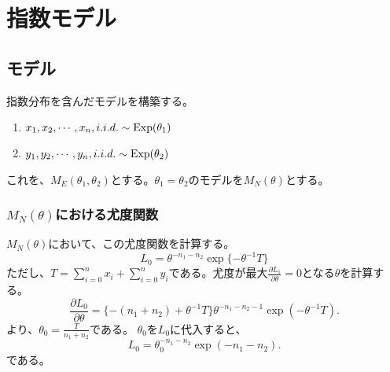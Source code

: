 \begin{comment}
 = (45-60*65/100)^2/(60*65/100)+(15-60*35/100)^2/(60*35/100)+(20-40*65/100)^2/(40*65/100) + (20-40*35/100)^2/(40*35/100)
 = 6.5934
\end{comment}

\section{指数モデル}
\subsection{モデル}
指数分布を含んだモデルを構築する。
\begin{enumerate}
 \item $x_1,x_2,\cdots,x_n,i.i.d. \sim \rm{Exp}(\theta_1)$
 \item $y_1,y_2,\cdots,y_n,i.i.d. \sim \rm{Exp}(\theta_2)$
\end{enumerate}
これを、$M_E(\theta_1,\theta_2)$とする。$\theta_1=\theta_2$のモデルを$M_N(\theta)$とする。
\subsubsection{$M_N(\theta)$における尤度関数}
$M_N(\theta)$において、この尤度関数を計算する。
\begin{equation*}
 L_{0} = \theta^{-n_1-n_2}\exp\{-\theta^{-1}T\}
\end{equation*}
ただし、$T=\sum_{i=0}^n x_i+\sum_{i=0}^n y_i$である。尤度が最大$\frac{\partial L_1}{\partial\theta}=0$となる$\theta$を計算する。
\begin{equation}
    \frac{\partial L_0}{\partial\theta} = \{ -(n_1+n_2)+\theta^{-1}T \}\theta^{-n_1-n_2-1}\exp(-\theta^{-1}T).
\end{equation}
より、$\theta_0=\frac{T}{n_1+n_2}$である。
$\theta_0$を$L_{0}$に代入すると、
\begin{equation}
    L_{0} = \theta_0^{-n_1-n_2}\exp(-n_1-n_2).
\end{equation}
である。

